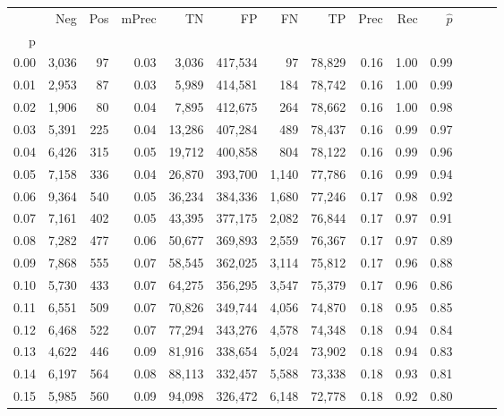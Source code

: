 \begin{tabular}{rrrrrrrrrrrrrr}
\toprule
{} &     Neg &    Pos & mPrec &       TN &       FP &      FN &      TP &  Prec &   Rec & $\hat{p}$ \\
p    &         &        &       &          &          &         &         &       &       &           \\
\midrule
0.00 &   3,036 &     97 &  0.03 &    3,036 &  417,534 &      97 &  78,829 &  0.16 &  1.00 &      0.99 \\
0.01 &   2,953 &     87 &  0.03 &    5,989 &  414,581 &     184 &  78,742 &  0.16 &  1.00 &      0.99 \\
0.02 &   1,906 &     80 &  0.04 &    7,895 &  412,675 &     264 &  78,662 &  0.16 &  1.00 &      0.98 \\
0.03 &   5,391 &    225 &  0.04 &   13,286 &  407,284 &     489 &  78,437 &  0.16 &  0.99 &      0.97 \\
0.04 &   6,426 &    315 &  0.05 &   19,712 &  400,858 &     804 &  78,122 &  0.16 &  0.99 &      0.96 \\
0.05 &   7,158 &    336 &  0.04 &   26,870 &  393,700 &   1,140 &  77,786 &  0.16 &  0.99 &      0.94 \\
0.06 &   9,364 &    540 &  0.05 &   36,234 &  384,336 &   1,680 &  77,246 &  0.17 &  0.98 &      0.92 \\
0.07 &   7,161 &    402 &  0.05 &   43,395 &  377,175 &   2,082 &  76,844 &  0.17 &  0.97 &      0.91 \\
0.08 &   7,282 &    477 &  0.06 &   50,677 &  369,893 &   2,559 &  76,367 &  0.17 &  0.97 &      0.89 \\
0.09 &   7,868 &    555 &  0.07 &   58,545 &  362,025 &   3,114 &  75,812 &  0.17 &  0.96 &      0.88 \\
0.10 &   5,730 &    433 &  0.07 &   64,275 &  356,295 &   3,547 &  75,379 &  0.17 &  0.96 &      0.86 \\
0.11 &   6,551 &    509 &  0.07 &   70,826 &  349,744 &   4,056 &  74,870 &  0.18 &  0.95 &      0.85 \\
0.12 &   6,468 &    522 &  0.07 &   77,294 &  343,276 &   4,578 &  74,348 &  0.18 &  0.94 &      0.84 \\
0.13 &   4,622 &    446 &  0.09 &   81,916 &  338,654 &   5,024 &  73,902 &  0.18 &  0.94 &      0.83 \\
0.14 &   6,197 &    564 &  0.08 &   88,113 &  332,457 &   5,588 &  73,338 &  0.18 &  0.93 &      0.81 \\
0.15 &   5,985 &    560 &  0.09 &   94,098 &  326,472 &   6,148 &  72,778 &  0.18 &  0.92 &      0.80 \\

\end{tabular}
